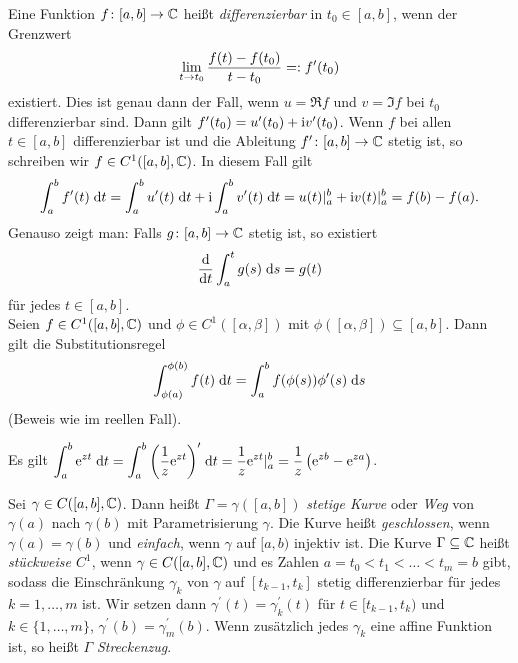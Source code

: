 \documentclass[a4paper,twoside,DIV15,BCOR12mm]{scrbook}
\begin{document}
\noindent Eine Funktion $f\colon[a,b]\to\mathbb{C}$ heißt \emph{differenzierbar} in $t_0\in[a,b]$, wenn der Grenzwert \[\lim_{t\to t_0}{\frac{f(t)-f(t_0)}{t-t_0}} =: f^\prime(t_0)\] existiert. Dies ist genau dann der Fall, wenn $u=\Re{f}$ und $v=\Im{f}$ bei $t_0$ differenzierbar sind. Dann gilt $f^\prime(t_0) = u^\prime(t_0) + \mathrm{i} v^\prime(t_0)$. Wenn $f$ bei allen $t\in[a,b]$ differenzierbar ist und die Ableitung $f^\prime\colon[a,b]\to\mathbb{C}$ stetig ist, so schreiben wir $f\in C^1([a,b],\mathbb{C})$. In diesem Fall gilt
\begin{equation}\label{2.1}
\int_{a}^{b}{f^\prime(t)}\;\mathrm{d}t = \int_{a}^{b}{u^\prime(t)}\;\mathrm{d}t + \mathrm{i}\int_{a}^{b}{v^\prime(t)}\;\mathrm{d}t = u(t)\vert_a^b + \mathrm{i} v(t)\vert_a^b = f(b) - f(a).
\end{equation}
Genauso zeigt man: Falls $g\colon[a,b]\to\mathbb{C}$ stetig ist, so existiert
\begin{equation}\label{2.2}
\frac{\mathrm{d}}{\mathrm{d}t} \int_{a}^{t}{g(s)}\;\mathrm{d}s = g(t)
\end{equation}
für jedes $t\in[a,b]$.\\
Seien $f\in C^1([a,b],\mathbb{C})$ und $\phi\in C^1([\alpha,\beta])$ mit $\phi([\alpha,\beta])\subseteq[a,b]$. Dann gilt die Substitutionsregel
\[\int_{\phi(a)}^{\phi(b)}{f(t)}\;\mathrm{d}t = \int_{a}^{b}{f(\phi(s))\phi^\prime(s)}\;\mathrm{d}s\]
(Beweis wie im reellen Fall).

\begin{bsp} \label{bsp2.1}
Es gilt $\displaystyle\int_{a}^{b}{\mathrm{e}^{zt}}\;\mathrm{d}t = \int_{a}^{b}{\left(\frac1z \mathrm{e}^{zt}\right)^\prime}\;\mathrm{d}t = \frac1z \mathrm{e}^{zt} \vert_a^b = \frac1z\left(\mathrm{e}^{zb}-\mathrm{e}^{za}\right)$.
\end{bsp}

\begin{dfn} \label{dfn2.2}
Sei $\gamma\in C([a,b],\mathbb{C})$. Dann heißt $\Gamma=\gamma([a,b])$ \emph{stetige Kurve} oder \emph{Weg} von $\gamma(a)$ nach $\gamma(b)$ mit Parametrisierung $\gamma$. Die Kurve heißt \emph{geschlossen}, wenn $\gamma(a)=\gamma(b)$ und \emph{einfach}, wenn $\gamma$ auf $[a,b)$ injektiv ist. Die Kurve $\Gamma\subseteq\mathbb{C}$ heißt \emph{stückweise $C^1$}, wenn $\gamma\in C([a,b],\mathbb{C})$ und es Zahlen $a=t_0<t_1<\dotso<t_m=b$ gibt, sodass die Einschränkung $\gamma_k$ von $\gamma$ auf $[t_{k-1},t_k]$ stetig differenzierbar für jedes $k=1,\dotsc,m$ ist. Wir setzen dann $\gamma^\prime(t)=\gamma_k^\prime(t)$ für $t\in[t_{k-1},t_k)$ und $k\in\{1,\dotsc,m\}$, $\gamma^\prime(b)=\gamma_m^\prime(b)$. Wenn zusätzlich jedes $\gamma_k$ eine affine Funktion ist, so heißt $\Gamma$ \emph{Streckenzug}.
\end{dfn}
\end{document}
